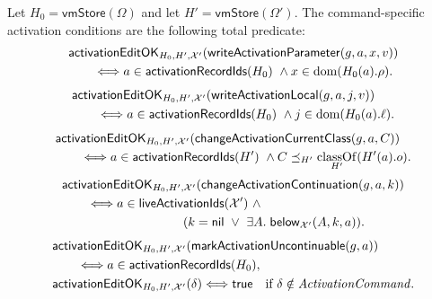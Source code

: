 Let $H_0=\mathsf{vmStore}(\Omega)$ and let $H'=\mathsf{vmStore}(\Omega')$.
The command-specific activation conditions are the following total predicate:
\begin{equation}\label{eq:activation-parameter-edit-validity}
\begin{split}
 &\mathsf{activationEditOK}_{H_0,H',\mathcal X'}
   (\mathsf{writeActivationParameter}(g,a,x,v))\\
 &\qquad\Longleftrightarrow
   a\in\mathsf{activationRecordIds}(H_0)\ \land x\in\mathop{\mathrm{dom}}(H_0(a).\rho).
\end{split}
\end{equation}
\begin{equation}\label{eq:activation-local-edit-validity}
\begin{split}
 &\mathsf{activationEditOK}_{H_0,H',\mathcal X'}
   (\mathsf{writeActivationLocal}(g,a,j,v))\\
 &\qquad\Longleftrightarrow
   a\in\mathsf{activationRecordIds}(H_0)\ \land j\in\mathop{\mathrm{dom}}(H_0(a).\ell).
\end{split}
\end{equation}
\begin{equation}\label{eq:activation-class-edit-validity}
\begin{split}
 &\mathsf{activationEditOK}_{H_0,H',\mathcal X'}
   (\mathsf{changeActivationCurrentClass}(g,a,C))\\
 &\qquad\Longleftrightarrow
   a\in\mathsf{activationRecordIds}(H')\ \land
   C\preceq_{H'}\mathop{\mathrm{classOf}}_{H'}(H'(a).o).
\end{split}
\end{equation}
\begin{equation}\label{eq:activation-continuation-edit-validity}
\begin{split}
 &\mathsf{activationEditOK}_{H_0,H',\mathcal X'}
   (\kw{changeActivationContinuation}(g,a,k))\\
 &\qquad\Longleftrightarrow
   a\in\mathsf{liveActivationIds}(\mathcal X')\ \land\\
 &\hspace{34mm}(k=\nil\ \lor\
      \exists A.\;\mathsf{below}_{\mathcal X'}(A,k,a)).
\end{split}
\end{equation}
\begin{equation}\label{eq:activation-uncontinuable-edit-validity}
\begin{split}
 &\mathsf{activationEditOK}_{H_0,H',\mathcal X'}
   (\mathsf{markActivationUncontinuable}(g,a))\\
 &\qquad\Longleftrightarrow a\in\mathsf{activationRecordIds}(H_0),\\
 &\mathsf{activationEditOK}_{H_0,H',\mathcal X'}(\delta)
   \Longleftrightarrow\mathsf{true}
   \quad\text{if }\delta\notin\mathit{ActivationCommand}.
\end{split}
\end{equation}
